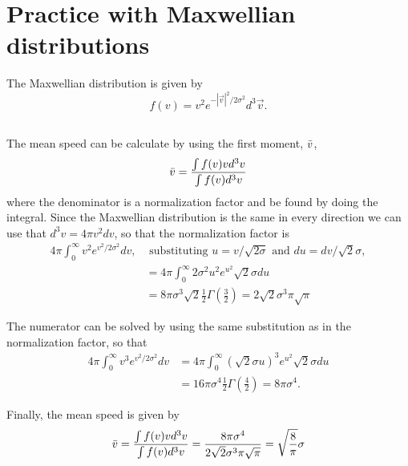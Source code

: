 \section{Practice with Maxwellian distributions}

The Maxwellian distribution is given by
\begin{equation}
    f(v) = v^2 e^{-|\Vec{v}|^2/2\sigma^2} d^3\Vec{v}.
\end{equation}

\subsection{}
The mean speed can be calculate by using the first moment, $\Bar{v}$,
\begin{equation}
    \Bar{v}=\frac{\int f(v)v d^3v}{\int f(v) d^3v}
\end{equation}
where the denominator is a normalization factor and be found by doing the integral. Since the Maxwellian distribution is the same in every direction we can use that $d^3v = 4\pi v^2 dv$, so that the normalization factor is
\begin{align*}
    4\pi\int_0^\infty v^2 e^{v^2/2\sigma^2}dv, & \text{ substituting } u= v/\sqrt{2\sigma} \text{ and } du=dv/\sqrt{2}\sigma,\\
    &= 4\pi\int_0^\infty 2\sigma^2 u^2 e^{u^2}\sqrt{2}\sigma du\\
    &= 8\pi \sigma^3 \sqrt{2} \frac{1}{2}\Gamma(\frac{3}{2}) = 2\sqrt{2}\sigma^3 \pi \sqrt{\pi}
\end{align*}

The numerator can be solved by using the same substitution as in the normalization factor, so that
\begin{align*}
    4\pi\int_0^\infty v^3 e^{v^2/2\sigma^2}dv 
    &= 4\pi\int_0^\infty (\sqrt{2}\sigma u)^3 e^{u^2}\sqrt{2}\sigma du\\
    &= 16 \pi \sigma^4\frac{1}{2}\Gamma(\frac{4}{2}) = 8\pi\sigma^4.
\end{align*}

Finally, the mean speed is given by
\begin{equation}
    \Bar{v}=\frac{\int f(v)v d^3v}{\int f(v) d^3v} = \frac{8\pi\sigma^4}{2\sqrt{2}\sigma^3 \pi \sqrt{\pi}}= \sqrt{\frac{8}{\pi}}\sigma
\end{equation}

